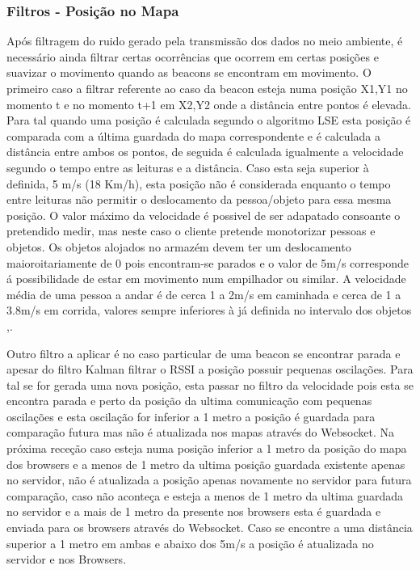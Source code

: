 \subsubsection{Filtros - Posição no Mapa}

\par Após filtragem do ruido gerado pela transmissão dos dados no meio ambiente, é necessário ainda filtrar certas ocorrências que ocorrem em certas posições e suavizar o movimento quando as beacons se encontram em movimento. O primeiro caso a filtrar  referente ao caso da beacon esteja numa posição X1,Y1 no momento t e no momento t+1  em X2,Y2 onde a distância entre pontos é elevada. Para tal quando uma posição é calculada segundo o algoritmo LSE esta posição é comparada com a última guardada do mapa correspondente e é calculada a distância entre ambos os pontos, de seguida é calculada igualmente a velocidade segundo o tempo entre as leituras e a distância. Caso esta seja superior à definida, 5 m/s (18 Km/h), esta posição não é considerada enquanto o tempo entre leituras não permitir o deslocamento da pessoa/objeto para essa mesma posição. O valor máximo da velocidade é possivel de ser adapatado consoante o pretendido medir, mas neste caso o cliente pretende monotorizar pessoas e objetos. Os objetos alojados no armazém devem ter um deslocamento maioroitariamente de 0 pois encontram-se parados e o valor de 5m/s corresponde á possibilidade de estar em movimento num empilhador ou similar. A velocidade média de uma pessoa a andar é de cerca 1 a 2m/s em caminhada e cerca de 1 a 3.8m/s em corrida, valores sempre inferiores à já definida no intervalo dos objetos \cite{walkingSpeed},\cite{Long2013}.
\par Outro filtro a aplicar é no caso particular de uma beacon se encontrar parada e apesar do filtro Kalman filtrar o RSSI a posição possuir pequenas oscilações. Para tal se for gerada uma nova posição, esta passar no filtro da velocidade pois esta se encontra parada e perto da posição da ultima comunicação com pequenas oscilações e esta oscilação for inferior a 1 metro a posição é guardada para comparação futura mas não é atualizada nos mapas através do Websocket. Na próxima receção caso esteja numa posição inferior a 1 metro da posição do mapa dos browsers e a menos de 1 metro da ultima posição guardada existente apenas no servidor, não é atualizada a posição apenas novamente no servidor para futura comparação, caso não aconteça e esteja a menos de 1 metro da ultima guardada no servidor e a mais de 1 metro da presente nos browsers esta é guardada e enviada para os browsers através do Websocket. Caso se encontre a uma distância superior a 1 metro em ambas e abaixo dos 5m/s a posição é atualizada no servidor e nos Browsers.

